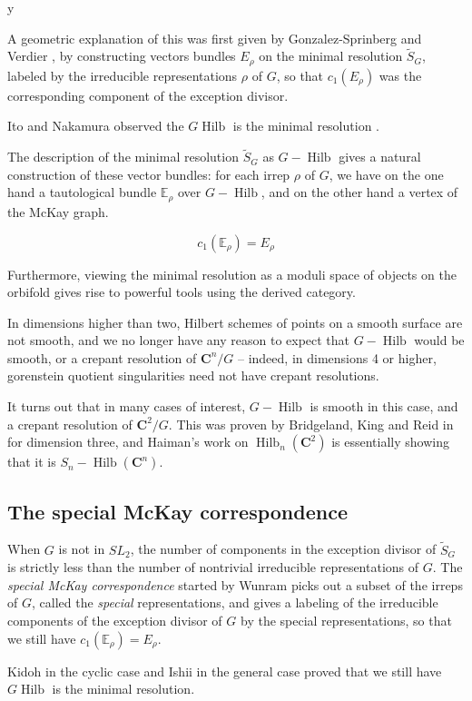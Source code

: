 y\documentclass{amsart}[12pt]
\theoremstyle{definition}
\newcommand{\C}{\mathbf{C}}
\DeclareMathOperator{\Hilb}{Hilb}
\begin{document}
A geometric explanation of this was first given by Gonzalez-Sprinberg and Verdier \cite{GSV}, by constructing vectors bundles $E_\rho$ on the minimal resolution $\widetilde{S}_G$, labeled by the irreducible representations $\rho$ of $G$, so that $c_1(E_\rho)$ was the corresponding component of the exception divisor.

Ito and Nakamura observed the $G\Hilb$ is the minimal resolution \cite{IN}.

The description of the minimal resolution $\widetilde{S}_G$ as $G-\Hilb$ gives a natural construction of these vector bundles: for each irrep $\rho$ of $G$, we have on the one hand a tautological bundle $\mathbb{E}_\rho$ over $G-\Hilb$, and on the other hand a vertex of the McKay graph.  

$$c_1(\mathbb{E}_\rho)=E_\rho$$

Furthermore, viewing the minimal resolution as a moduli space of objects on the orbifold gives rise to powerful tools using the derived category.  

In dimensions higher than two, Hilbert schemes of points on a smooth surface are not smooth, and we no longer have any reason to expect that $G-\Hilb$ would be smooth, or a crepant resolution of $\C^n/G$ -- indeed, in dimensions 4 or higher, gorenstein quotient singularities need not have crepant resolutions.

It turns out that in many cases of interest, $G-\Hilb$ is smooth in this case, and a crepant resolution of $\C^2/G$.  This was proven by Bridgeland, King and Reid in \cite{BKR} for dimension three, and Haiman's work on $\Hilb_n(\C^2)$ is essentially showing that it is $S_n-\Hilb(\C^n)$.



\subsection{The special McKay correspondence}

When $G$ is not in $SL_2$, the number of components in the exception divisor of $\widetilde{S}_G$ is strictly less than the number of nontrivial irreducible representations of $G$.  The \emph{special McKay correspondence} started by Wunram \cite{wunram} picks out a subset of the irreps of $G$, called the \emph{special} representations, and gives a labeling of the irreducible components of the exception divisor of $G$ by the special representations, so that we still have $c_1(\mathbb{E}_\rho)=E_\rho$.

Kidoh \cite{Kidoh} in the cyclic case and Ishii \cite{ishii} in the general case proved that we still have $G\Hilb$ is the minimal resolution.
\end{document}
